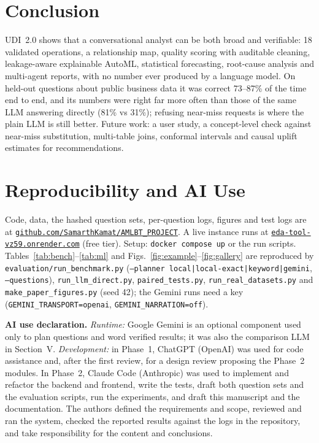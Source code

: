 \documentclass[conference]{IEEEtran}
\begin{document}
\section{Conclusion}
UDI~2.0 shows that a conversational analyst can be both broad and verifiable: 18 validated operations, a relationship map, quality scoring with auditable cleaning, leakage-aware explainable AutoML, statistical forecasting, root-cause analysis and multi-agent reports, with no number ever produced by a language model. On held-out questions about public business data it was correct 73--87\% of the time end to end, and its numbers were right far more often than those of the same LLM answering directly (81\% vs 31\%); refusing near-miss requests is where the plain LLM is still better. Future work: a user study, a concept-level check against near-miss substitution, multi-table joins, conformal intervals and causal uplift estimates for recommendations.

\section{Reproducibility and AI Use}
Code, data, the hashed question sets, per-question logs, figures and test logs are at \href{https://github.com/SamarthKamat/AMLBT_PROJECT}{\texttt{github.com/SamarthKamat/AMLBT\_PROJECT}}. A live instance runs at \href{https://eda-tool-vz59.onrender.com}{\texttt{eda-tool-vz59.onrender.com}} (free tier). Setup: \texttt{docker compose up} or the run scripts. Tables~\ref{tab:bench}--\ref{tab:ml} and Figs.~\ref{fig:example}--\ref{fig:gallery} are reproduced by \texttt{evaluation/run\_benchmark.py} (\texttt{--planner local|local-exact|keyword|gemini}, \texttt{--questions}), \texttt{run\_llm\_direct.py}, \texttt{paired\_tests.py}, \texttt{run\_real\_datasets.py} and \texttt{make\_paper\_figures.py} (seed 42); the Gemini runs need a key (\texttt{GEMINI\_TRANSPORT=openai}, \texttt{GEMINI\_NARRATION=off}).

\textbf{AI use declaration.} \emph{Runtime:} Google Gemini is an optional component used only to plan questions and word verified results; it was also the comparison LLM in Section~V. \emph{Development:} in Phase~1, ChatGPT (OpenAI) was used for code assistance and, after the first review, for a design review proposing the Phase~2 modules. In Phase~2, Claude Code (Anthropic) was used to implement and refactor the backend and frontend, write the tests, draft both question sets and the evaluation scripts, run the experiments, and draft this manuscript and the documentation. The authors defined the requirements and scope, reviewed and ran the system, checked the reported results against the logs in the repository, and take responsibility for the content and conclusions.
\end{document}

